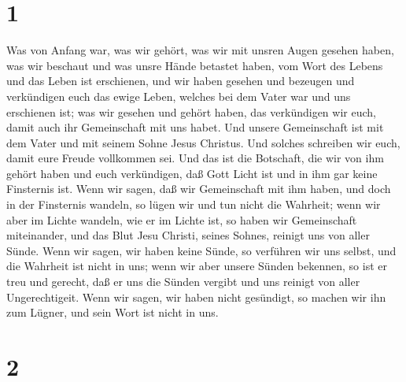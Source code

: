 \hypertarget{section}{%
\section{1}\label{section}}

 Was von Anfang war, was wir gehört, was wir mit unsren
Augen gesehen haben, was wir beschaut und was unsre Hände betastet
haben, vom Wort des Lebens  und das Leben ist erschienen,
und wir haben gesehen und bezeugen und verkündigen euch das ewige Leben,
welches bei dem Vater war und uns erschienen ist;  was wir
gesehen und gehört haben, das verkündigen wir euch, damit auch ihr
Gemeinschaft mit uns habet. Und unsere Gemeinschaft ist mit dem Vater
und mit seinem Sohne Jesus Christus.  Und solches
schreiben wir euch, damit eure Freude vollkommen sei.  Und
das ist die Botschaft, die wir von ihm gehört haben und euch
verkündigen, daß Gott Licht ist und in ihm gar keine Finsternis ist.
 Wenn wir sagen, daß wir Gemeinschaft mit ihm haben, und
doch in der Finsternis wandeln, so lügen wir und tun nicht die Wahrheit;
 wenn wir aber im Lichte wandeln, wie er im Lichte ist, so
haben wir Gemeinschaft miteinander, und das Blut Jesu Christi, seines
Sohnes, reinigt uns von aller Sünde.  Wenn wir sagen, wir
haben keine Sünde, so verführen wir uns selbst, und die Wahrheit ist
nicht in uns;  wenn wir aber unsere Sünden bekennen, so
ist er treu und gerecht, daß er uns die Sünden vergibt und uns reinigt
von aller Ungerechtigeit.  Wenn wir sagen, wir haben
nicht gesündigt, so machen wir ihn zum Lügner, und sein Wort ist nicht
in uns.

\hypertarget{section-1}{%
\section{2}\label{section-1}}

